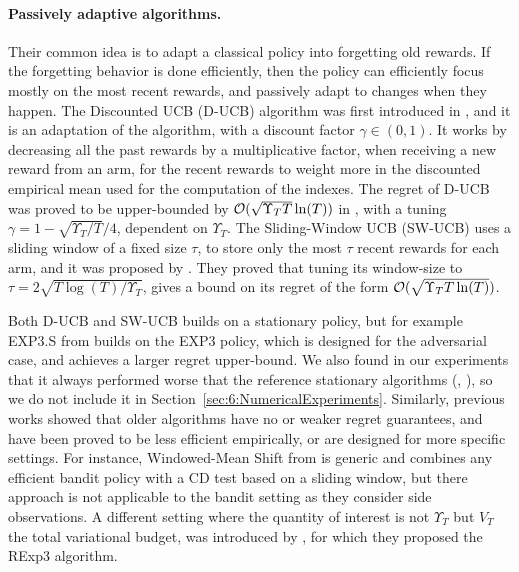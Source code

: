 
\paragraph{Passively adaptive algorithms.}
%
Their common idea is to adapt a classical policy into forgetting old rewards.
If the forgetting behavior is done efficiently, then the policy can efficiently focus mostly on the most recent rewards, and passively adapt to changes when they happen.
%
The Discounted UCB (D-UCB) algorithm was first introduced in \cite{Kocsis06}, and it is an adaptation of the \UCB{} algorithm, with a discount factor $\gamma\in(0,1)$. It works by decreasing all the past rewards by a multiplicative factor, when receiving a new reward from an arm, for the recent rewards to weight more in the discounted empirical mean used for the computation of the \UCB{} indexes.
The regret of D-UCB was proved to be upper-bounded by $\mathcal{O}(\sqrt{\Upsilon_T T }\ln(T))$ in \cite{Garivier11UCBDiscount}, with a tuning $\gamma = 1 - \sqrt{\Upsilon_T/T}/4$, dependent on $\Upsilon_T$.
%
The Sliding-Window UCB (SW-UCB) uses a sliding window of a fixed size $\tau$, to store only the most $\tau$ recent rewards for each arm,
and it was proposed by \cite{Garivier11UCBDiscount}. They proved that tuning its window-size to $\tau = 2 \sqrt{T\log(T)/\Upsilon_T}$, gives a bound on its regret of the form $\mathcal{O}(\sqrt{\Upsilon_T T \ln(T)})$.

Both D-UCB and SW-UCB builds on a stationary policy,
but for example EXP3.S from \cite{Auer02NonStochastic}
builds on the EXP3 policy, which is designed for the adversarial case,
and achieves a larger regret upper-bound.
We also found in our experiments that it always performed worse that the reference stationary algorithms (\eg, \klUCB), so we do not include it in Section~\ref{sec:6:NumericalExperiments}.
Similarly, previous works showed that older algorithms have no or weaker regret guarantees, and have been proved to be less efficient empirically, or are designed for more specific settings.
%
For instance, Windowed-Mean Shift from \cite{YuMannor09} is generic and combines any efficient bandit policy with a CD test based on a sliding window, but there approach is not applicable to the bandit setting as they consider side observations.
%
A different setting where the quantity of interest is not $\Upsilon_T$ but $V_T$ the total variational budget, was introduced by \cite{Besbes14stochastic}, for which they proposed the RExp3 algorithm.
%

